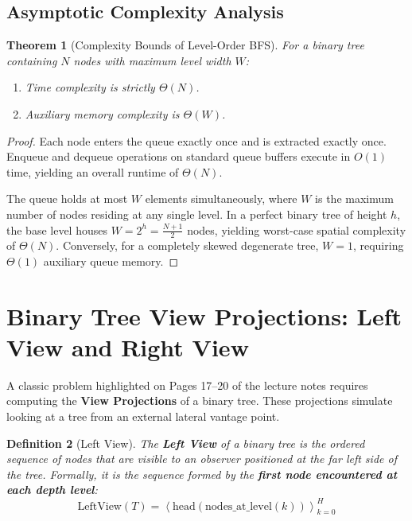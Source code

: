 \documentclass[10pt,journal,compsoc,onecolumn]{IEEEtran}
\newtheorem{theorem}{Theorem}
\newtheorem{definition}[theorem]{Definition}
\begin{document}
\subsection{Asymptotic Complexity Analysis}
\begin{theorem}[Complexity Bounds of Level-Order BFS]
For a binary tree containing $N$ nodes with maximum level width $W$:
\begin{enumerate}
    \item Time complexity is strictly $\Theta(N)$.
    \item Auxiliary memory complexity is $\Theta(W)$.
\end{enumerate}
\end{theorem}
\begin{proof}
Each node enters the queue exactly once and is extracted exactly once. Enqueue and dequeue operations on standard queue buffers execute in $O(1)$ time, yielding an overall runtime of $\Theta(N)$.

The queue holds at most $W$ elements simultaneously, where $W$ is the maximum number of nodes residing at any single level. In a perfect binary tree of height $h$, the base level houses $W = 2^h = \frac{N + 1}{2}$ nodes, yielding worst-case spatial complexity of $\Theta(N)$. Conversely, for a completely skewed degenerate tree, $W = 1$, requiring $\Theta(1)$ auxiliary queue memory.
\end{proof}

\section{Binary Tree View Projections: Left View and Right View}
\label{sec:views}

A classic problem highlighted on Pages 17--20 of the lecture notes requires computing the \textbf{View Projections} of a binary tree. These projections simulate looking at a tree from an external lateral vantage point.

\begin{definition}[Left View]
The \textbf{Left View} of a binary tree is the ordered sequence of nodes that are visible to an observer positioned at the far left side of the tree. Formally, it is the sequence formed by the \textbf{first node encountered at each depth level}:
\begin{equation}
    \mathrm{LeftView}(T) = \left\langle \mathrm{head}(\mathrm{nodes\_at\_level}(k)) \right\rangle_{k=0}^{H}
\end{equation}
\end{definition}
\end{document}

